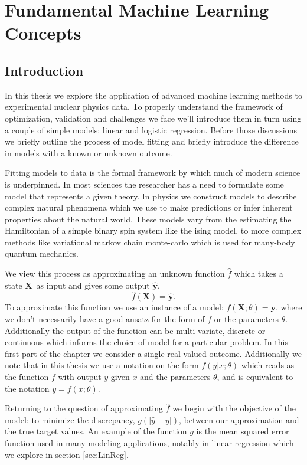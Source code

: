 \chapter{Fundamental Machine Learning Concepts}
\section{Introduction}

In this thesis we explore the application of advanced machine learning methods to experimental nuclear physics data. To properly understand the framework of optimization, validation and challenges we face we'll introduce them in turn using a couple of simple models; linear and logistic regression. Before those discussions we briefly outline the process of model fitting and briefly introduce the difference in models with a known or unknown outcome.

Fitting models to data is the formal framework by which much of modern science is underpinned. In most sciences the researcher has a need to formulate some model that represents a given theory. In physics we construct models to describe complex natural phenomena which we use to make predictions or infer inherent properties about the natural world. These models vary from the estimating the Hamiltonian of a simple binary spin system like the ising model, to more complex methods like variational markov chain monte-carlo which is used for many-body quantum mechanics.

We view this process as approximating an unknown function $\hat{f}$ which takes a state $\mathbf{X}$ as input and gives some output $\mathbf{\hat{y}}$,  
 $$\hat{f}(\mathbf{X}) = \mathbf{\hat{y}}.$$ 
To approximate this function we use an instance of a model: $f(\mathbf{X}; \theta) = \mathbf{y}$, where we don't necessarily have a good ansatz for the form of $f$ or the parameters $\theta$. Additionally the output of the function can be multi-variate, discrete or continuous which informs the choice of model for a particular problem. In this first part of the chapter we consider a single real valued outcome. Additionally we note  that in this thesis we use a notation on the form $f(y | x; \theta )$ which reads as the function $f$ with output $y$ given $x$ and the parameters $\theta$, and is equivalent to the notation $y = f(x; \theta)$.

 Returning to the question of approximating $\hat{f}$ we begin with the objective of the model: to minimize the discrepancy, $g(|\hat{y} - y|)$, between our approximation and the true target values. An  example of the function $g$ is the mean squared error function used in many modeling applications, notably in linear regression which we explore in section \ref{sec:LinReg}.

